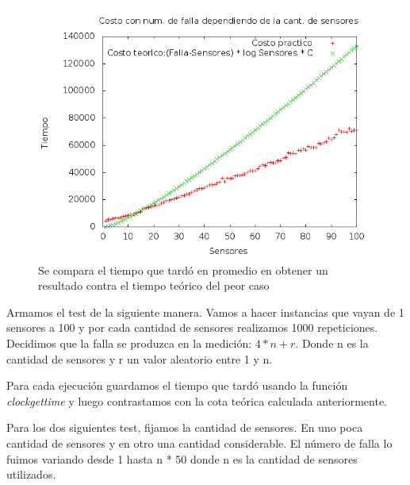 \quad

\quad


\begin{figure}[H]
	\centering
	\includegraphics[scale=0.6]{ej2-grafico1.png}
	\caption{ Se compara el tiempo que tard\'o en promedio en obtener un resultado contra el tiempo te\'orico del peor caso}
\end{figure}

\quad

\quad Armamos el test de la siguiente manera. Vamos a hacer instancias que vayan de 1 sensores a 100 y por cada cantidad de sensores realizamos 1000 repeticiones. Decidimos que la falla se produzca en la medici\'on: \quad $4 * n + r $. Donde n es la cantidad de sensores y r un valor aleatorio entre 1 y n.

\quad Para cada ejecuci\'on guardamos el tiempo que tard\'o usando la funci\'on \textit{clockgettime} y luego contrastamos con la cota te\'orica calculada anteriormente.

\quad Para los dos siguientes test, fijamos la cantidad de sensores. En uno poca cantidad de sensores y en otro una cantidad considerable. El n\'umero de falla lo fuimos variando desde 1 hasta n * 50 donde n es la cantidad de sensores utilizados.



